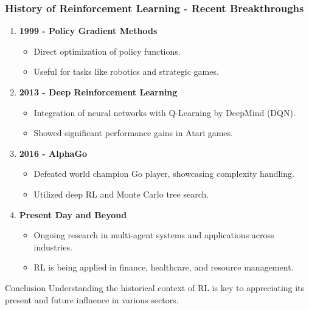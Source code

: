 \documentclass{beamer}
\begin{document}
\begin{frame}[fragile]
    \frametitle{History of Reinforcement Learning - Recent Breakthroughs}
    \begin{enumerate}[resume]
        \item \textbf{1999 - Policy Gradient Methods}
        \begin{itemize}
            \item Direct optimization of policy functions.
            \item Useful for tasks like robotics and strategic games.
        \end{itemize}
        
        \item \textbf{2013 - Deep Reinforcement Learning}
        \begin{itemize}
            \item Integration of neural networks with Q-Learning by DeepMind (DQN).
            \item Showed significant performance gains in Atari games.
        \end{itemize}
        
        \item \textbf{2016 - AlphaGo}
        \begin{itemize}
            \item Defeated world champion Go player, showcasing complexity handling.
            \item Utilized deep RL and Monte Carlo tree search.
        \end{itemize}
        
        \item \textbf{Present Day and Beyond}
        \begin{itemize}
            \item Ongoing research in multi-agent systems and applications across industries.
            \item RL is being applied in finance, healthcare, and resource management.
        \end{itemize}
    \end{enumerate}
    
    \begin{block}{Conclusion}
        Understanding the historical context of RL is key to appreciating its present and future influence in various sectors.
    \end{block}
\end{frame}
\end{document}
